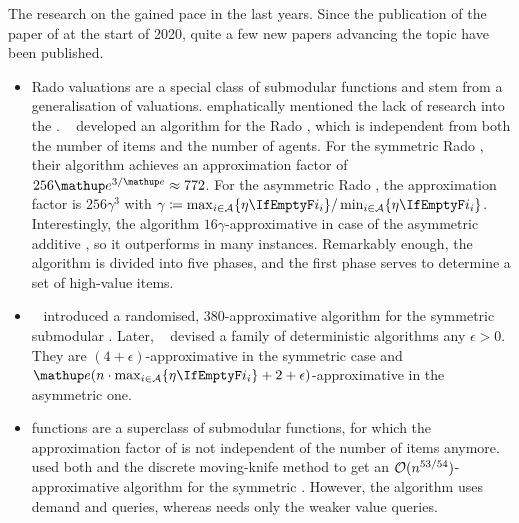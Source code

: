 The research on the \NSW{} gained pace in the last years.
Since the publication of the paper of \citeauthor{APNSWuSVþUM} at the start of 2020, quite a few new papers advancing the topic have been published.
\begin{itemize}[leftmargin=*, nosep]
	\item
	Rado valuations are a special class of submodular functions and stem from a generalisation of \OXS{} valuations.
	 emphatically mentioned the lack of research into the \OXS{} \NSW.
	~\cite{approximating_nsw_under_rado_valuations} developed an algorithm for the Rado \NSW, which is independent from both the number of items and the number of agents.
	For the symmetric Rado \NSW, their algorithm achieves an approximation factor of \(256 \euler^{3/\euler} \approx 772\).
	For the asymmetric Rado \NSW, the approximation factor is \(256 \gamma^3\) with \(\gamma \coloneq \max_{i \in \agents} \braces{\weight} / \min_{i \in \agents} \braces{\weight}\).
	Interestingly, the algorithm \(16 \gamma\)-approximative in case of the asymmetric additive \NSW, so it outperforms \SMatch{} in many instances.
	Remarkably enough, the algorithm is divided into five phases, and the first phase serves to determine a set of high-value items.

	\item
	\citeauthor{a_constfactor_approx_algo_for_nsw_with_submod_valuations}~\cite{a_constfactor_approx_algo_for_nsw_with_submod_valuations} introduced a randomised, \(380\)-approximative algorithm for the symmetric submodular \NSW.
	Later, \citeauthor{approx_nsw_by_matching_and_local_search}~\cite{approx_nsw_by_matching_and_local_search} devised a family of deterministic algorithms any \(\epsilon > 0\).
	They are \((4+\epsilon)\)-approximative in the symmetric case and \(\euler(n \cdot \max_{i \in \agents} \braces{\weight} + 2 + \epsilon)\)-approximative in the asymmetric one.

	\item
	\XOS{} functions are a superclass of submodular functions, for which the approximation factor of \RepReMatch{} is not independent of the number of items anymore.
	~\cite{sublin_approx_algo_for_nsw_with_xos_valuations} used both \RepReMatch{} and the discrete moving-knife method to get an \(\mathcal{O}(n^{53/54})\)-approximative algorithm for the symmetric \XOS{} \NSW.
	However, the algorithm uses demand and \XOS{} queries, whereas \RepReMatch{} needs only the weaker value queries.


\end{itemize}
